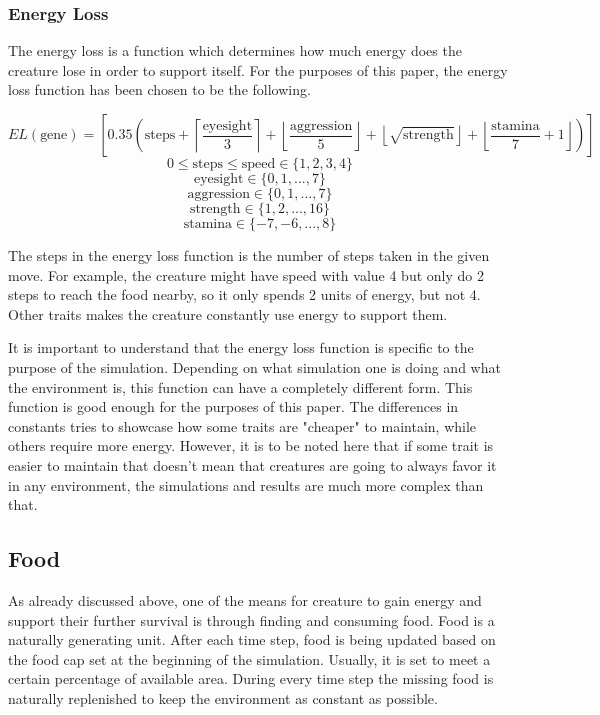 \documentclass{article}
\begin{document}
\subsubsection{Energy Loss}

The energy loss is a function which determines how much energy does the creature lose in order to support itself. For the purposes of this paper, the energy loss function has been chosen to be the following.

\[
EL(\text{gene}) = \left[ 0.35 \left(
\text{steps} 
+ \left\lceil \frac{\text{eyesight}}{3} \right\rceil 
+ \left\lfloor \frac{\text{aggression}}{5} \right\rfloor 
+ \left\lfloor \sqrt{\text{strength}} \right\rfloor 
+ \left\lfloor \frac{\text{stamina}}{7} + 1 \right\rfloor
\right) \right]
\]
\[0 \leq \text{steps} \leq \text{speed}\in\{1,2,3,4\}\]
\[\text{eyesight}\in\{0,1,...,7\}\]
\[\text{aggression}\in\{0,1,...,7\}\]
\[\text{strength}\in\{1,2,...,16\}\]
\[\text{stamina}\in\{-7,-6,...,8\}\]

The steps in the energy loss function is the number of steps taken in the given move. For example, the creature might have speed with value 4 but only do 2 steps to reach the food nearby, so it only spends 2 units of energy, but not 4. Other traits makes the creature constantly use energy to support them.

It is important to understand that the energy loss function is specific to the purpose of the simulation. Depending on what simulation one is doing and what the environment is, this function can have a completely different form. This function is good enough for the purposes of this paper. The differences in constants tries to showcase how some traits are "cheaper" to maintain, while others require more energy. However, it is to be noted here that if some trait is easier to maintain that doesn't mean that creatures are going to always favor it in any environment, the simulations and results are much more complex than that.

\subsection{Food}

As already discussed above, one of the means for creature to gain energy and support their further survival is through finding and consuming food. Food is a naturally generating unit. After each time step, food is being updated based on the food cap set at the beginning of the simulation. Usually, it is set to meet a certain percentage of available area. During every time step the missing food is naturally replenished to keep the environment as constant as possible.
\end{document}
